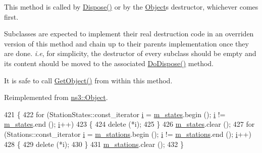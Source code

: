 This method is called by \hyperlink{classns3_1_1Object_aa90ae598863f6c251cdab3c3722afdaf}{Dispose()} or by the \hyperlink{classns3_1_1Object}{Object}\textquotesingle{}s destructor, whichever comes first.

Subclasses are expected to implement their real destruction code in an overriden version of this method and chain up to their parent\textquotesingle{}s implementation once they are done. {\itshape i.\+e}, for simplicity, the destructor of every subclass should be empty and its content should be moved to the associated \hyperlink{classns3_1_1WifiRemoteStationManager_a39d2443b156f25c494c117c427f54022}{Do\+Dispose()} method.

It is safe to call \hyperlink{classns3_1_1Object_a13e18c00017096c8381eb651d5bd0783}{Get\+Object()} from within this method. 

Reimplemented from \hyperlink{classns3_1_1Object_a475d429a75d302d4775f4ae32479b287}{ns3\+::\+Object}.


\begin{DoxyCode}
421 \{
422   \textcolor{keywordflow}{for} (StationStates::const\_iterator \hyperlink{bernuolliDistribution_8m_a6f6ccfcf58b31cb6412107d9d5281426}{i} = \hyperlink{classns3_1_1WifiRemoteStationManager_aa1b308110d49a43fcad379978fd90cc5}{m\_states}.begin (); \hyperlink{bernuolliDistribution_8m_a6f6ccfcf58b31cb6412107d9d5281426}{i} != 
      \hyperlink{classns3_1_1WifiRemoteStationManager_aa1b308110d49a43fcad379978fd90cc5}{m\_states}.end (); \hyperlink{bernuolliDistribution_8m_a6f6ccfcf58b31cb6412107d9d5281426}{i}++)
423     \{
424       \textcolor{keyword}{delete} (*i);
425     \}
426   \hyperlink{classns3_1_1WifiRemoteStationManager_aa1b308110d49a43fcad379978fd90cc5}{m\_states}.clear ();
427   \textcolor{keywordflow}{for} (Stations::const\_iterator \hyperlink{bernuolliDistribution_8m_a6f6ccfcf58b31cb6412107d9d5281426}{i} = \hyperlink{classns3_1_1WifiRemoteStationManager_abe6711bcc48ef1c5a3f4c9949137080d}{m\_stations}.begin (); \hyperlink{bernuolliDistribution_8m_a6f6ccfcf58b31cb6412107d9d5281426}{i} != 
      \hyperlink{classns3_1_1WifiRemoteStationManager_abe6711bcc48ef1c5a3f4c9949137080d}{m\_stations}.end (); \hyperlink{bernuolliDistribution_8m_a6f6ccfcf58b31cb6412107d9d5281426}{i}++)
428     \{
429       \textcolor{keyword}{delete} (*i);
430     \}
431   \hyperlink{classns3_1_1WifiRemoteStationManager_abe6711bcc48ef1c5a3f4c9949137080d}{m\_stations}.clear ();
432 \}
\end{DoxyCode}

